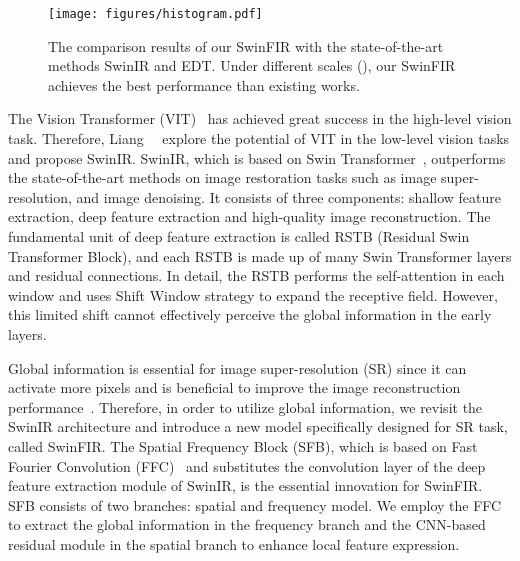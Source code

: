 \documentclass[10pt,twocolumn,letterpaper]{article}
\begin{document}
\begin{figure}[t]
	\centering
	\texttt{[image: figures/histogram.pdf]}
	\vspace{-6mm}
	\caption{The comparison results of our SwinFIR with the state-of-the-art methods SwinIR and EDT. Under different scales (), our SwinFIR achieves the best performance than existing works.} 
	\label{fig:histogram}
\end{figure}


The Vision Transformer (VIT)~\cite{dosovitskiy2020image, carion2020end, wang2021pyramid, guo2021sotr, liu2021swin}  has achieved great success in the high-level vision task. Therefore, Liang~\etal~\cite{liang2021swinir} explore the potential of VIT in the low-level vision tasks and propose SwinIR. SwinIR, which is based on Swin Transformer~\cite{liu2021swin}, outperforms the state-of-the-art methods on image restoration tasks such as image super-resolution, and image denoising. It consists of three components: shallow feature extraction, deep feature extraction and high-quality image reconstruction. The fundamental unit of deep feature extraction is called RSTB (Residual Swin Transformer Block), and each RSTB is made up of many Swin Transformer layers and residual connections. In detail, the RSTB performs the self-attention in each window and uses Shift Window strategy to expand the receptive field.  However, this limited shift cannot effectively perceive the global information in the early layers.

Global information is essential for image super-resolution (SR) since it can activate more pixels and is beneficial to improve the image reconstruction performance~\cite{gu2021interpreting}. Therefore, in order to utilize global information, we revisit the SwinIR architecture and introduce a new model specifically designed for SR task, called SwinFIR. The Spatial Frequency Block (SFB), which is based on Fast Fourier Convolution (FFC)~\cite{chi2020fast} and substitutes the convolution layer of the deep feature extraction module of SwinIR, is the essential innovation for SwinFIR. SFB consists of two branches: spatial and frequency model. We employ the FFC to extract the global information in the frequency branch and the CNN-based residual module in the spatial branch to enhance local feature expression.
\end{document}
